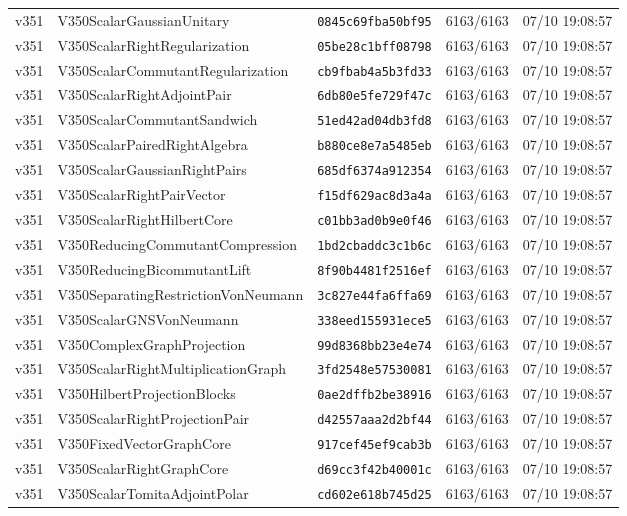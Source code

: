 \documentclass[11pt]{article}
\theoremstyle{definition}\newtheorem{deriv}{Derivação}
\begin{document}
{\begin{longtable}{@{}lllll@{}}
v351 & V350ScalarGaussianUnitary & \texttt{0845c69fba50bf95} & 6163/6163 & 07/10 19:08:57 \\
v351 & V350ScalarRightRegularization & \texttt{05be28c1bff08798} & 6163/6163 & 07/10 19:08:57 \\
v351 & V350ScalarCommutantRegularization & \texttt{cb9fbab4a5b3fd33} & 6163/6163 & 07/10 19:08:57 \\
v351 & V350ScalarRightAdjointPair & \texttt{6db80e5fe729f47c} & 6163/6163 & 07/10 19:08:57 \\
v351 & V350ScalarCommutantSandwich & \texttt{51ed42ad04db3fd8} & 6163/6163 & 07/10 19:08:57 \\
v351 & V350ScalarPairedRightAlgebra & \texttt{b880ce8e7a5485eb} & 6163/6163 & 07/10 19:08:57 \\
v351 & V350ScalarGaussianRightPairs & \texttt{685df6374a912354} & 6163/6163 & 07/10 19:08:57 \\
v351 & V350ScalarRightPairVector & \texttt{f15df629ac8d3a4a} & 6163/6163 & 07/10 19:08:57 \\
v351 & V350ScalarRightHilbertCore & \texttt{c01bb3ad0b9e0f46} & 6163/6163 & 07/10 19:08:57 \\
v351 & V350ReducingCommutantCompression & \texttt{1bd2cbaddc3c1b6c} & 6163/6163 & 07/10 19:08:57 \\
v351 & V350ReducingBicommutantLift & \texttt{8f90b4481f2516ef} & 6163/6163 & 07/10 19:08:57 \\
v351 & V350SeparatingRestrictionVonNeumann & \texttt{3c827e44fa6ffa69} & 6163/6163 & 07/10 19:08:57 \\
v351 & V350ScalarGNSVonNeumann & \texttt{338eed155931ece5} & 6163/6163 & 07/10 19:08:57 \\
v351 & V350ComplexGraphProjection & \texttt{99d8368bb23e4e74} & 6163/6163 & 07/10 19:08:57 \\
v351 & V350ScalarRightMultiplicationGraph & \texttt{3fd2548e57530081} & 6163/6163 & 07/10 19:08:57 \\
v351 & V350HilbertProjectionBlocks & \texttt{0ae2dffb2be38916} & 6163/6163 & 07/10 19:08:57 \\
v351 & V350ScalarRightProjectionPair & \texttt{d42557aaa2d2bf44} & 6163/6163 & 07/10 19:08:57 \\
v351 & V350FixedVectorGraphCore & \texttt{917cef45ef9cab3b} & 6163/6163 & 07/10 19:08:57 \\
v351 & V350ScalarRightGraphCore & \texttt{d69cc3f42b40001c} & 6163/6163 & 07/10 19:08:57 \\
v351 & V350ScalarTomitaAdjointPolar & \texttt{cd602e618b745d25} & 6163/6163 & 07/10 19:08:57 \\

\end{longtable}}
\end{document}
